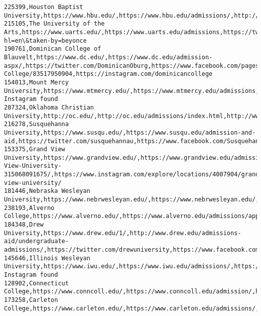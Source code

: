 \documentclass[11pt]{article}
\begin{document}
\begin{Verbatim}[commandchars=\\\{\}]
225399,Houston Baptist University,https://www.hbu.edu/,https://www.hbu.edu/admissions/,http://twitter.com/HoustonBaptistU,http://facebook.com/HoustonBaptistUniversity,http://instagram.com/houstonbaptistuniversity
215105,The University of the Arts,https://www.uarts.edu/,https://www.uarts.edu/admissions,https://twitter.com/uarts,https://www.facebook.com/uarts,https://www.instagram.com/p/BkGcY6kFxk8/?hl=en\&taken-by=beyonce
190761,Dominican College of Blauvelt,https://www.dc.edu/,https://www.dc.edu/admission-aspx/,https://twitter.com/DominicanOburg,https://www.facebook.com/pages/Dominican-College/83517950904,https://instagram.com/dominicancollege
154013,Mount Mercy University,https://www.mtmercy.edu/,https://www.mtmercy.edu/admissions,http://twitter.com/MountMercy,http://www.facebook.com/mountmercyuniversity,No Instagram found
207324,Oklahoma Christian University,http://oc.edu/,http://oc.edu/admissions/index.html,http://www.twitter.com/okchristian/,http://www.facebook.com/oklahomachristian/,https://instagram.com/ok\_christian/
216278,Susquehanna University,https://www.susqu.edu/,https://www.susqu.edu/admission-and-aid,https://twitter.com/susquehannau,https://www.facebook.com/SusquehannaU,https://instagram.com/susquehannau/
153375,Grand View University,https://www.grandview.edu/,https://www.grandview.edu/admissions,https://twitter.com/grandviewuniv,https://www.facebook.com/Grand-View-University-315068091675/,https://www.instagram.com/explore/locations/4007904/grand-view-university/
181446,Nebraska Wesleyan University,https://www.nebrwesleyan.edu/,https://www.nebrwesleyan.edu/,http://www.twitter.com/NEWesleyan,http://www.facebook.com/NebraskaWesleyan,https://instagram.com/newesleyan
238193,Alverno College,https://www.alverno.edu/,https://www.alverno.edu/admissions/apply.php,https://twitter.com/alvernocollege,https://facebook.com/alvernocollege,https://www.instagram.com/alvernocollege/
184348,Drew University,https://www.drew.edu/1/,http://www.drew.edu/admissions-aid/undergraduate-admissions/,https://twitter.com/drewuniversity,https://www.facebook.com/DrewUniversity/,https://www.instagram.com/drewuniversity/
145646,Illinois Wesleyan University,https://www.iwu.edu/,https://www.iwu.edu/admissions/,https://twitter.com/IL\_Wesleyan,https://www.facebook.com/illinoiswesleyan,No Instagram found
128902,Connecticut College,https://www.conncoll.edu/,https://www.conncoll.edu/admission/,http://www.twitter.com/ConnCollege,https://www.facebook.com/ConnecticutCollege,http://instagram.com/ConnCollege
173258,Carleton College,https://www.carleton.edu/,https://www.carleton.edu/admissions/,//twitter.com/CarletonCollege,//www.facebook.com/CarletonCollege,http://instagram.com/carletoncollege

\end{Verbatim}
\end{document}
